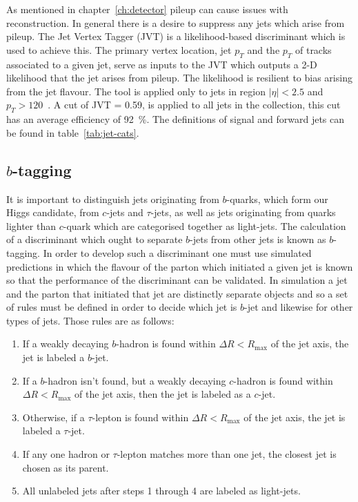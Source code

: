 As mentioned in chapter~\ref{ch:detector} pileup can cause issues with
reconstruction. In general there is a desire to suppress any jets which arise
from pileup. The Jet Vertex Tagger (JVT) is a likelihood-based discriminant
which is used to achieve this. The primary vertex location, jet $p_T$ and the
$p_T$ of tracks associated to a given jet, serve as inputs to the JVT which
outputs a 2-D likelihood that the jet arises from pileup. The likelihood is
resilient to bias arising from the jet flavour. The tool is applied only to jets
in region $\lvert  \eta \rvert < 2.5$ and $p_T > 120$~\GeV. A cut of JVT = 0.59,
is applied to all jets in the collection, this cut has an average efficiency of
92~\%. The definitions of signal and forward jets can be found in
table~\ref{tab:jet-cats}.


\subsection{\texorpdfstring{$b$}{b}-tagging}
\label{sec:btagging}

It is important to distinguish jets originating from $b$-quarks, which form our
Higgs candidate, from $c$-jets and $\tau$-jets, as well as jets originating from
quarks lighter than $c$-quark which are categorised together as light-jets. The
calculation of a discriminant which ought to separate $b$-jets from other jets is
known as $b$-tagging. In order to develop such a discriminant one must use
simulated predictions in which the flavour of the parton which initiated a given
jet is known so that the performance of the discriminant can be validated. In
simulation a jet and the parton that initiated that jet are distinctly separate
objects and so a set of rules must be defined in order to decide which jet is
$b$-jet and likewise for other types of jets. Those rules are as follows:
\begin{enumerate}
\item  If a weakly decaying $b$-hadron is found within $\Delta R<R_{\text{max}}$ of the
  jet axis, the jet is labeled a $b$-jet.
\item  If a $b$-hadron isn't found, but a weakly decaying $c$-hadron is
  found within $\Delta R<R_{\text{max}}$ of the jet axis, then the jet is labeled as a $c$-jet.
\item  Otherwise, if a $\tau$-lepton is found within
  $\Delta R<R_{\text{max}}$ of the jet axis, the jet is labeled a $\tau$-jet.
\item If any one hadron or $\tau$-lepton matches more than one jet, the closest jet
  is chosen as its parent.
\item All unlabeled jets after steps 1 through 4 are labeled as light-jets.
\end{enumerate}

